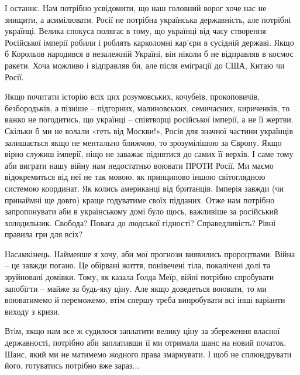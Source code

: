 І останнє. Нам потрібно усвідомити, що наш головний ворог хоче нас не знищити,
а асимілювати. Росії не потрібна українська державність, але потрібні українці.
Велика спокуса полягає в тому, що українці від часу створення Російської
імперії робили і роблять карколомні кар’єри в сусідній державі. Якщо б Корольов
народився в незалежній Україні, він ніколи б не відправляв в космос ракети.
Хоча можливо і відправляв би, але після еміграції до США, Китаю чи Росії. 

Якщо почитати історію всіх цих розумовських, кочубеїв, прокоповичів,
безбородьків, а пізніше – підгорних, малиновських, семичасних, кириченків, то
важко не погодитись, що українці – співтворці російської імперії, а не її
жертви. Скільки б ми не волали «геть від Москви!», Росія для значної частини
українців залишається якщо не ментально ближчою, то зрозумілішою за Європу.
Якщо вірно служиш імперії, ніщо не заважає піднятися до самих її верхів. І саме
тому аби виграти нашу війну нам недостатньо воювати ПРОТИ Росії. Ми маємо
відокремиться від неї не так мовою, як принципово іншою світоглядною системою
координат. Як колись американці від британців. Імперія завжди (чи принаймні ще
довго) краще годуватиме своїх підданих. Отже нам потрібно запропонувати аби в
українському домі було щось, важливіше за російський холодильник. Свобода?
Повага до людської гідності? Справедливість? Рівні правила гри для всіх?

Насамкінець. Найменше я хочу, аби мої прогнози виявились пророцтвами. Війна –
це завжди погано. Це обірвані життя, понівечені тіла, покалічені долі та
зруйновані домівки. Тому, як казала Ґолда Меїр, війні потрібно спробувати
запобігти – майже за будь-яку ціну. Але якщо доведеться воювати, то ми
воюватимемо й переможемо, втім спершу треба випробувати всі інші варіанти
виходу з кризи.

Втім, якщо нам все ж судилося заплатити велику ціну за збереження власної
державності, потрібно аби заплативши її ми отримали шанс на новий початок.
Шанс, який ми не матимемо жодного права змарнувати. І щоб не сплюндрувати його,
готуватись потрібно вже зараз...

